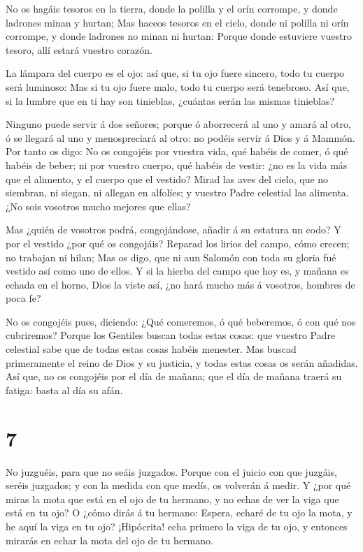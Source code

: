  No os hagáis tesoros en la tierra, donde la polilla y el
orín corrompe, y donde ladrones minan y hurtan;  Mas haceos
tesoros en el cielo, donde ni polilla ni orín corrompe, y donde ladrones
no minan ni hurtan:  Porque donde estuviere vuestro tesoro,
allí estará vuestro corazón.

 La lámpara del cuerpo es el ojo: así que, si tu ojo fuere
sincero, todo tu cuerpo será luminoso:  Mas si tu ojo fuere
malo, todo tu cuerpo será tenebroso. Así que, si la lumbre que en ti hay
son tinieblas, ¿cuántas serán las mismas tinieblas?

 Ninguno puede servir á dos señores; porque ó aborrecerá al
uno y amará al otro, ó se llegará al uno y menospreciará al otro: no
podéis servir á Dios y á Mammón.  Por tanto os digo: No os
congojéis por vuestra vida, qué habéis de comer, ó qué habéis de beber;
ni por vuestro cuerpo, qué habéis de vestir: ¿no es la vida más que el
alimento, y el cuerpo que el vestido?  Mirad las aves del
cielo, que no siembran, ni siegan, ni allegan en alfolíes; y vuestro
Padre celestial las alimenta. ¿No sois vosotros mucho mejores que ellas?

 Mas ¿quién de vosotros podrá, congojándose, añadir á su
estatura un codo?  Y por el vestido ¿por qué os congojáis?
Reparad los lirios del campo, cómo crecen; no trabajan ni hilan;
 Mas os digo, que ni aun Salomón con toda su gloria fué
vestido así como uno de ellos.  Y si la hierba del campo
que hoy es, y mañana es echada en el horno, Dios la viste así, ¿no hará
mucho más á vosotros, hombres de poca fe?

 No os congojéis pues, diciendo: ¿Qué comeremos, ó qué
beberemos, ó con qué nos cubriremos?  Porque los Gentiles
buscan todas estas cosas: que vuestro Padre celestial sabe que de todas
estas cosas habéis menester.  Mas buscad primeramente el
reino de Dios y su justicia, y todas estas cosas os serán añadidas.
 Así que, no os congojéis por el día de mañana; que el día
de mañana traerá su fatiga: basta al día su afán.

\hypertarget{section-6}{%
\section{7}\label{section-6}}

 No juzguéis, para que no seáis juzgados. 
Porque con el juicio con que juzgáis, seréis juzgados; y con la medida
con que medís, os volverán á medir.  Y ¿por qué miras la
mota que está en el ojo de tu hermano, y no echas de ver la viga que
está en tu ojo?  O ¿cómo dirás á tu hermano: Espera, echaré
de tu ojo la mota, y he aquí la viga en tu ojo?  ¡Hipócrita!
echa primero la viga de tu ojo, y entonces mirarás en echar la mota del
ojo de tu hermano.

